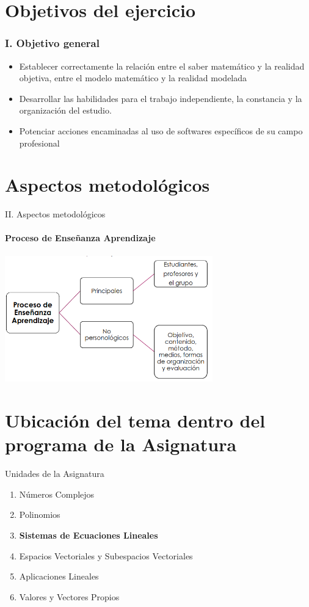 \documentclass{beamer}
\begin{document}
\section{Objetivos del ejercicio} %
\begin{frame}
  \frametitle{I. Objetivo general}
  \begin{itemize}
    \item Establecer correctamente la relación entre el saber matemático y la realidad objetiva,
          entre el modelo matemático y la realidad modelada
    \item Desarrollar las habilidades para el trabajo independiente, la constancia y la organización del estudio.
    \item Potenciar acciones encaminadas al uso de softwares específicos de su campo profesional
  \end{itemize}
\end{frame}

\section{Aspectos metodológicos}
\begin{frame}{II. Aspectos metodológicos} %
  \framesubtitle{Proceso de Enseñanza Aprendizaje}
  \begin{center}
    \includegraphics[width=9.0cm]{images/Grafica1.png}
  \end{center}
\end{frame}

\section{Ubicación del tema dentro del programa de la Asignatura} %
\begin{frame}{Unidades de la Asignatura}
  \begin{enumerate}
    \item Números Complejos
    \item Polinomios
    \item {\bf Sistemas de Ecuaciones Lineales}
    \item Espacios Vectoriales y Subespacios Vectoriales
    \item Aplicaciones Lineales
    \item Valores y Vectores Propios
  \end{enumerate}
\end{frame}
\end{document}
